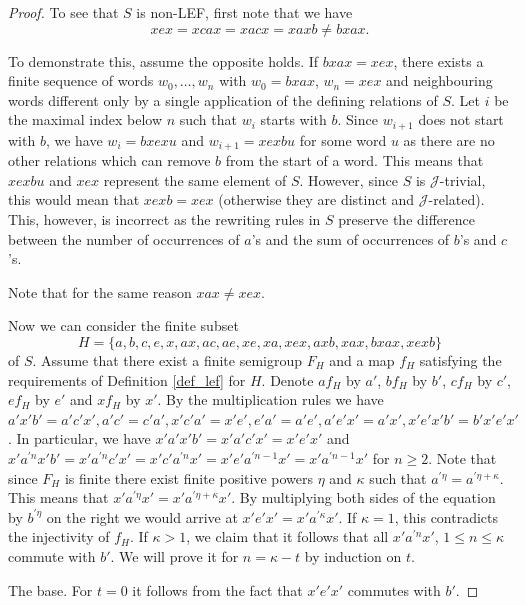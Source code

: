 \documentclass{article}
\theoremstyle{definition}
\def\J{\mathcal J}
\begin{document}
\begin{proof}
To see that $S$ is non-LEF, first note that we have 
$$
xex = xcax = xacx = xaxb \neq bxax.
$$

To demonstrate this, assume the opposite holds. If $bxax = xex$, there exists a finite sequence of words $w_0, \ldots, w_n$ with $w_0 = bxax$, $w_n = xex$ and neighbouring words different only by a single application of the defining relations of $S$. Let $i$ be the maximal index below $n$ such that $w_i$ starts with $b$. Since  $w_{i+1}$ does not start with $b$, we have $w_{i} = bxex u$ and $w_{i+1} = xex b u$ for some word $u$ as there are no other relations which can remove $b$ from the start of a word. This means that $xex b u$ and $xex$ represent the same element of $S$. However, since $S$ is $\J$-trivial, this would mean that $xex b = xex$ (otherwise they are distinct and $\J$-related). This, however, is incorrect as the rewriting rules in $S$ preserve the difference between the number of occurrences of $a$'s and the sum of occurrences of $b$'s and $c$'s. 

Note that for the same reason $xax \neq xex$.

Now we can consider the finite subset $$H = \{a,b,c,e,x,ax, ac, ae, xe,xa,xex,axb,xax,bxax,xexb\}$$ of $S$. Assume that there exist a finite semigroup $F_H$ and a map $f_H$ satisfying the requirements of Definition \ref{def_lef} for $H$. Denote $af_H$ by $a'$, $b f_H$ by $b'$, $c f_H$ by $c'$, $e f_H$ by $e'$ and $x f_H$ by $x'$. By the multiplication rules we have $a'x'b' = a'c'x', a'c' = c'a', x'c'a' = x'e', e'a' = a'e', a'e'x' = a'x', x'e'x'b' = b'x'e'x'$. In particular, we have $x' a' x' b' = x'a'c' x' = x'e'x'$ and $x' a^{\prime n} x' b' = x' a^{\prime n} c' x' = x'c' a^{\prime n}  x' = x' e' a^{\prime n-1}  x' = x' a^{\prime n-1}  x'$ for $n \ge 2$. Note that since $F_H$ is finite there exist finite positive powers $\eta$ and $\kappa$ such that $a^{\prime \eta} = a^{\prime \eta + \kappa}$. This means that $x' a^{\prime \eta} x' = x' a^{\prime \eta + \kappa} x'$. By multiplying both sides of the equation by $b^{\prime \eta}$ on the right we would arrive at $x' e' x' = x' a^{\prime \kappa} x'$. If $\kappa = 1$, this contradicts the injectivity of $f_H$. If $\kappa > 1$, we claim that it follows that all $x' a^{\prime n} x'$, $1 \le n \le \kappa$ commute with $b'$. We will prove it for $n = \kappa - t$ by induction on $t$.

The base. For $t=0$ it follows from the fact that $x' e' x'$ commutes with $b'$.


\end{proof}
\end{document}
